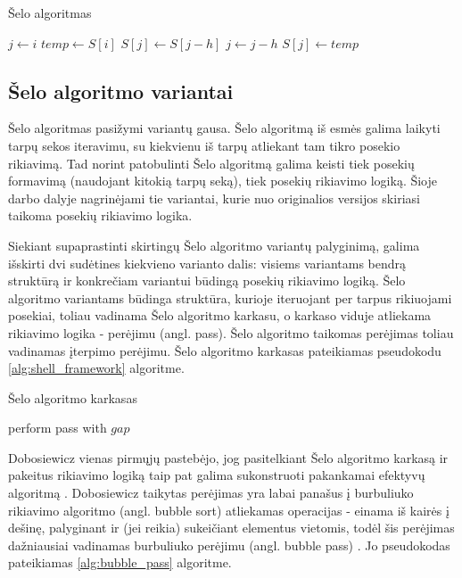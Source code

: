 \documentclass{VUMIFInfBakalaurinis}
\begin{document}
\begin{algorithm}[H]
    \caption{Šelo algoritmas}\label{alg:shellsort}
    \begin{algorithmic}[1]
            \State $j\gets i$
            \State $temp\gets S[i]$
            \Repeat
              \State $S[j]\gets S[j - h]$
              \State $j\gets j-h$
            \State $S[j]\gets temp$
          \EndIf
        \EndFor
      \EndFor
    \end{algorithmic}
  \end{algorithm}

\subsection{Šelo algoritmo variantai}

Šelo algoritmas pasižymi variantų gausa.
Šelo algoritmą iš esmės galima laikyti tarpų sekos iteravimu, su kiekvienu iš tarpų atliekant tam tikro posekio rikiavimą.
Tad norint patobulinti Šelo algoritmą galima keisti tiek posekių formavimą (naudojant kitokią tarpų seką), tiek posekių rikiavimo logiką.
Šioje darbo dalyje nagrinėjami tie variantai, kurie nuo originalios versijos skiriasi taikoma posekių rikiavimo logika.

Siekiant supaprastinti skirtingų Šelo algoritmo variantų palyginimą, galima išskirti dvi sudėtines kiekvieno varianto dalis:
visiems variantams bendrą struktūrą ir konkrečiam variantui būdingą posekių rikiavimo logiką.
Šelo algoritmo variantams būdinga struktūra, kurioje iteruojant per tarpus rikiuojami posekiai, toliau vadinama Šelo algoritmo karkasu,
o karkaso viduje atliekama rikiavimo logika - perėjimu (angl. pass).
Šelo algoritmo taikomas perėjimas toliau vadinamas įterpimo perėjimu.
Šelo algoritmo karkasas pateikiamas pseudokodu \ref{alg:shell_framework} algoritme.

\begin{algorithm}[H]
  \caption{Šelo algoritmo karkasas}\label{alg:shell_framework}
  \begin{algorithmic}[1]
        \State perform pass with $gap$
    \EndFor
  \end{algorithmic}
\end{algorithm}

Dobosiewicz vienas pirmųjų pastebėjo, jog pasitelkiant
Šelo algoritmo karkasą ir pakeitus rikiavimo logiką taip pat galima sukonstruoti pakankamai efektyvų algoritmą \cite{dobosiewicz1980efficient}.
Dobosiewicz taikytas perėjimas yra labai panašus į burbuliuko rikiavimo algoritmo (angl. bubble sort) atliekamas operacijas -
einama iš kairės į dešinę, palyginant ir (jei reikia) sukeičiant elementus vietomis, todėl
šis perėjimas dažniausiai vadinamas burbuliuko perėjimu (angl. bubble pass) \cite{sedgewick1996analysis}.
Jo pseudokodas pateikiamas \ref{alg:bubble_pass} algoritme.
\end{document}
